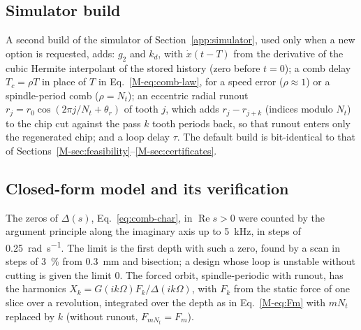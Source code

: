 \subsection{Simulator build}\label{supp:delayed-sim}

A second build of the simulator of Section~\ref{app:simulator}, used only when a new option is requested, adds: $g_2$ and $k_d$, with $\dot x(t-T)$ from the derivative of the cubic Hermite interpolant of the stored history (zero before $t=0$); a comb delay $T_c=\rho T$ in place of $T$ in Eq.~\eqref{M-eq:comb-law}, for a speed error ($\rho\approx1$) or a spindle-period comb ($\rho=N_t$); an eccentric radial runout $r_j=r_0\cos(2\pi j/N_t+\theta_r)$ of tooth $j$, which adds $r_j-r_{j+k}$ (indices modulo $N_t$) to the chip cut against the pass $k$ tooth periods back, so that runout enters only the regenerated chip; and a loop delay $\tau$. The default build is bit-identical to that of Sections~\ref{M-sec:feasibility}--\ref{M-sec:certificates}.

\subsection{Closed-form model and its verification}\label{supp:delayed-cf}

The zeros of $\Delta(s)$, Eq.~\eqref{eq:comb-char}, in $\operatorname{Re}s>0$ were counted by the argument principle along the imaginary axis up to \SI{5}{\kilo\hertz}, in steps of \SI{0.25}{\radian\per\second}. The limit is the first depth with such a zero, found by a scan in steps of \SI{3}{\percent} from \SI{0.3}{\milli\metre} and bisection; a design whose loop is unstable without cutting is given the limit 0. The forced orbit, spindle-periodic with runout, has the harmonics $X_k=G(ik\Omega)F_k/\Delta(ik\Omega)$, with $F_k$ from the static force of one slice over a revolution, integrated over the depth as in Eq.~\eqref{M-eq:Fm} with $mN_t$ replaced by $k$ (without runout, $F_{mN_t}=F_m$).

